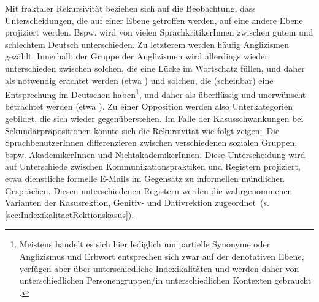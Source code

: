 Mit fraktaler Rekursivit{\"a}t beziehen sich \citet[38]{Irvine2000} auf die Beobachtung, dass Unterscheidungen, die auf einer Ebene getroffen werden, auf eine andere Ebene projiziert werden. 
Bspw. wird von vielen SprachkritikerInnen zwischen \glqq gutem\grqq{} und \glqq schlechtem\grqq{} Deutsch unterschieden. 
Zu letzterem werden häufig Anglizismen gezählt. 
Innerhalb der Gruppe der Anglizismen wird allerdings wieder unterschieden zwischen solchen, die eine Lücke im Wortschatz füllen, und daher als notwendig erachtet werden (etwa ) und solchen, die (scheinbar) eine Entsprechung im Deutschen haben\footnote{Meistens handelt es sich hier lediglich um partielle Synonyme oder Anglizismus und Erbwort entsprechen sich zwar auf der denotativen Ebene, verfügen aber über unterschiedliche Indexikalitäten und werden daher von unterschiedlichen Personengruppen/in unterschiedlichen Kontexten gebraucht \citep[s. hierzu][]{Spitzmuller.2007}.}, und daher als überflüssig und unerwünscht betrachtet werden (etwa ). 
Zu einer Opposition werden also Unterkategorien gebildet, die sich wieder gegen{\"u}berstehen. 
Im Falle der Kasusschwankungen bei Sekund{\"a}rpr{\"a}positionen könnte sich die Rekursivit{\"a}t wie folgt zeigen:~Die SprachbenutzerInnen differenzieren zwischen verschiedenen sozialen Gruppen, bspw. AkademikerInnen und NichtakademikerInnen. Diese Unterscheidung wird auf Unterschiede zwischen Kommunikationspraktiken und Registern projiziert, etwa dienstliche formelle E-Mails im Gegensatz zu informellen mündlichen Gesprächen. 
Diesen unterschiedenen Registern werden die wahrgenommenen Varianten der Kasusrektion, Genitiv- und Dativrektion zugeordnet~(s. \autoref{sec:IndexikalitaetRektionskasus}).


